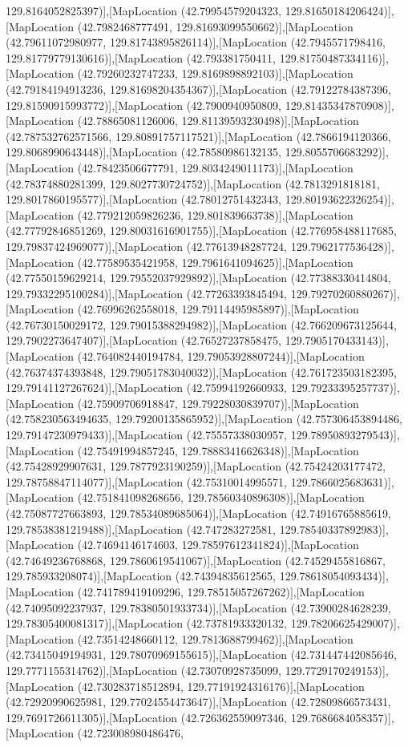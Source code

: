 129.8164052825397)],[MapLocation (42.79954579204323, 129.81650184206424)],[MapLocation (42.7982468777491, 129.81693099550662)],[MapLocation (42.79611072980977, 129.81743895826114)],[MapLocation (42.7945571798416, 129.81779779130616)],[MapLocation (42.793381750411, 129.81750487334116)],[MapLocation (42.79260232747233, 129.8169898892103)],[MapLocation (42.79184194913236, 129.81698204354367)],[MapLocation (42.79122784387396, 129.81590915993772)],[MapLocation (42.7900940950809, 129.81435347870908)],[MapLocation (42.78865081126006, 129.81139593230498)],[MapLocation (42.787532762571566, 129.80891757117521)],[MapLocation (42.7866194120366, 129.8068990643448)],[MapLocation (42.78580986132135, 129.8055706683292)],[MapLocation (42.78423506677791, 129.8034249011173)],[MapLocation (42.78374880281399, 129.8027730724752)],[MapLocation (42.7813291818181, 129.8017860195577)],[MapLocation (42.78012751432343, 129.80193622326254)],[MapLocation (42.779212059826236, 129.801839663738)],[MapLocation (42.77792846851269, 129.80031616901755)],[MapLocation (42.776958488117685, 129.79837424969077)],[MapLocation (42.77613948287724, 129.7962177536428)],[MapLocation (42.77589535421958, 129.7961641094625)],[MapLocation (42.77550159629214, 129.79552037929892)],[MapLocation (42.77388330414804, 129.79332295100284)],[MapLocation (42.77263393845494, 129.79270260880267)],[MapLocation (42.76996262558018, 129.79114495985897)],[MapLocation (42.76730150029172, 129.79015388294982)],[MapLocation (42.766209673125644, 129.7902273647407)],[MapLocation (42.76527237858475, 129.7905170433143)],[MapLocation (42.764082440194784, 129.79053928807244)],[MapLocation (42.76374374393848, 129.79051783040032)],[MapLocation (42.761723503182395, 129.79141127267624)],[MapLocation (42.75994192660933, 129.79233395257737)],[MapLocation (42.75909706918847, 129.79228030839707)],[MapLocation (42.758230563494635, 129.79200135865952)],[MapLocation (42.757306453894486, 129.79147230979433)],[MapLocation (42.75557338030957, 129.78950893279543)],[MapLocation (42.75491994857245, 129.78883416626348)],[MapLocation (42.75428929907631, 129.7877923190259)],[MapLocation (42.75424203177472, 129.78758847114077)],[MapLocation (42.75310014995571, 129.7866025683631)],[MapLocation (42.751841098268656, 129.78560340896308)],[MapLocation (42.75087727663893, 129.78534089685064)],[MapLocation (42.74916765885619, 129.78538381219488)],[MapLocation (42.747283272581, 129.78540337892983)],[MapLocation (42.74694146174603, 129.78597612341824)],[MapLocation (42.74649236768868, 129.7860619541067)],[MapLocation (42.74529455816867, 129.785933208074)],[MapLocation (42.74394835612565, 129.78618054093434)],[MapLocation (42.741789419109296, 129.78515057267262)],[MapLocation (42.74095092237937, 129.78380501933734)],[MapLocation (42.73900284628239, 129.78305400081317)],[MapLocation (42.73781933320132, 129.78206625429007)],[MapLocation (42.73514248660112, 129.7813688799462)],[MapLocation (42.73415049194931, 129.78070969155615)],[MapLocation (42.731447442085646, 129.7771155314762)],[MapLocation (42.73070928735099, 129.7729170249153)],[MapLocation (42.730283718512894, 129.77191924316176)],[MapLocation (42.72920990625981, 129.77024554473647)],[MapLocation (42.72809866573431, 129.7691726611305)],[MapLocation (42.726362559097346, 129.7686684058357)],[MapLocation (42.723008980486476, 